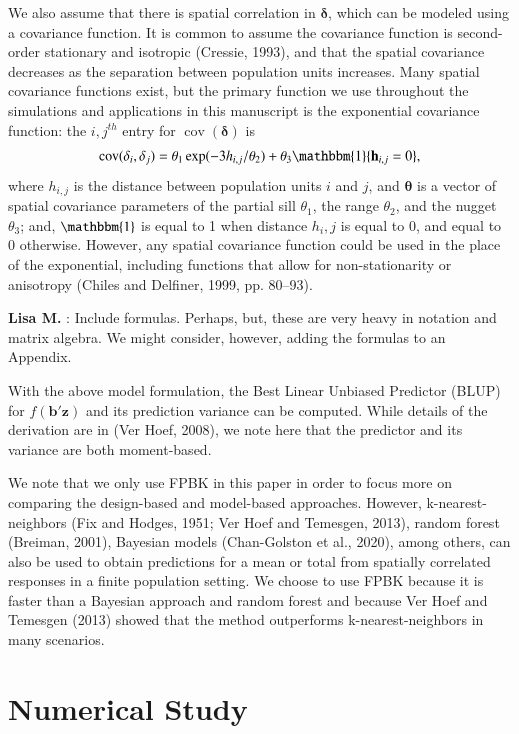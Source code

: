 \documentclass[]{elsarticle} %
\begin{document}
We also assume that there is spatial correlation in \(\bm{\delta}\),
which can be modeled using a covariance function. It is common to assume
the covariance function is second-order stationary and isotropic
(Cressie, 1993), and that the spatial covariance decreases as the
separation between population units increases. Many spatial covariance
functions exist, but the primary function we use throughout the
simulations and applications in this manuscript is the exponential
covariance function: the \(i,j^{th}\) entry for
\(\mathop{\mathrm{{cov}}}(\bm{\delta})\) is \mbox{}
\begin{align}\label{equation:expcov}
\mathop{\mathrm{{cov}}}(\delta_i, \delta_j) = \theta_1\exp(-3h_{i,j}/\theta_2) + \theta_3\mathbbm{1}\{\mathbf{h}_{i,j} = 0\}, 
\end{align} where \(h_{i,j}\) is the distance between population units
\(i\) and \(j\), and \(\bm{\theta}\) is a vector of spatial covariance
parameters of the partial sill \(\theta_1\), the range \(\theta_2\), and
the nugget \(\theta_3\); and, \(\mathbbm{1}\) is equal to 1 when
distance \(h_i,j\) is equal to 0, and equal to 0 otherwise. However, any
spatial covariance function could be used in the place of the
exponential, including functions that allow for non-stationarity or
anisotropy (Chiles and Delfiner, 1999, pp. 80--93).

\textbf{Lisa M.} : Include formulas. Perhaps, but, these are very heavy
in notation and matrix algebra. We might consider, however, adding the
formulas to an Appendix.

With the above model formulation, the Best Linear Unbiased Predictor
(BLUP) for \(f(\mathbf{b}'\mathbf{z})\) and its prediction variance can
be computed. While details of the derivation are in (Ver Hoef, 2008), we
note here that the predictor and its variance are both moment-based.

We note that we only use FPBK in this paper in order to focus more on
comparing the design-based and model-based approaches. However,
k-nearest-neighbors (Fix and Hodges, 1951; Ver Hoef and Temesgen, 2013),
random forest (Breiman, 2001), Bayesian models (Chan-Golston et al.,
2020), among others, can also be used to obtain predictions for a mean
or total from spatially correlated responses in a finite population
setting. We choose to use FPBK because it is faster than a Bayesian
approach and random forest and because Ver Hoef and Temesgen (2013)
showed that the method outperforms k-nearest-neighbors in many
scenarios.

\hypertarget{sec:numstudy}{%
\section{Numerical Study}\label{sec:numstudy}}
\end{document}
